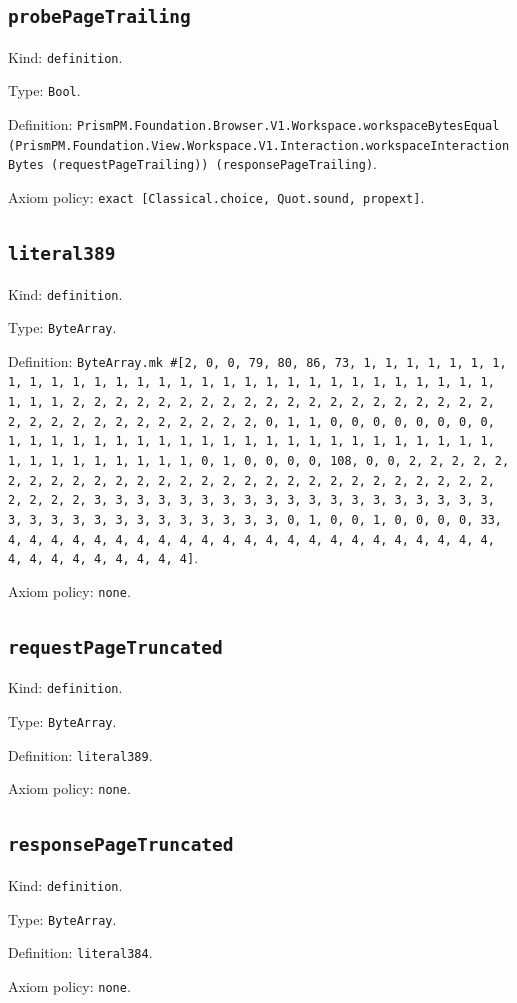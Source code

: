 \documentclass[11pt]{article}
\begin{document}
\subsection*{\texttt{probePageTrailing}}
\noindent Kind: \texttt{definition}.\par
\noindent Type: \texttt{Bool}.\par
\noindent Definition: \texttt{PrismPM.Foundation.Browser.V1.Workspace.workspaceBytesEqual (PrismPM.Foundation.View.Workspace.V1.Interaction.workspaceInteractionBytes (requestPageTrailing)) (responsePageTrailing)}.\par
\noindent Axiom policy: \texttt{exact [Classical.choice, Quot.sound, propext]}.\par
\subsection*{\texttt{literal389}}
\noindent Kind: \texttt{definition}.\par
\noindent Type: \texttt{ByteArray}.\par
\noindent Definition: \texttt{ByteArray.mk \#[2, 0, 0, 79, 80, 86, 73, 1, 1, 1, 1, 1, 1, 1, 1, 1, 1, 1, 1, 1, 1, 1, 1, 1, 1, 1, 1, 1, 1, 1, 1, 1, 1, 1, 1, 1, 1, 1, 1, 1, 2, 2, 2, 2, 2, 2, 2, 2, 2, 2, 2, 2, 2, 2, 2, 2, 2, 2, 2, 2, 2, 2, 2, 2, 2, 2, 2, 2, 2, 2, 2, 2, 0, 1, 1, 0, 0, 0, 0, 0, 0, 0, 0, 1, 1, 1, 1, 1, 1, 1, 1, 1, 1, 1, 1, 1, 1, 1, 1, 1, 1, 1, 1, 1, 1, 1, 1, 1, 1, 1, 1, 1, 1, 1, 1, 0, 1, 0, 0, 0, 0, 108, 0, 0, 2, 2, 2, 2, 2, 2, 2, 2, 2, 2, 2, 2, 2, 2, 2, 2, 2, 2, 2, 2, 2, 2, 2, 2, 2, 2, 2, 2, 2, 2, 2, 2, 3, 3, 3, 3, 3, 3, 3, 3, 3, 3, 3, 3, 3, 3, 3, 3, 3, 3, 3, 3, 3, 3, 3, 3, 3, 3, 3, 3, 3, 3, 3, 3, 0, 1, 0, 0, 1, 0, 0, 0, 0, 33, 4, 4, 4, 4, 4, 4, 4, 4, 4, 4, 4, 4, 4, 4, 4, 4, 4, 4, 4, 4, 4, 4, 4, 4, 4, 4, 4, 4, 4, 4, 4, 4]}.\par
\noindent Axiom policy: \texttt{none}.\par
\subsection*{\texttt{requestPageTruncated}}
\noindent Kind: \texttt{definition}.\par
\noindent Type: \texttt{ByteArray}.\par
\noindent Definition: \texttt{literal389}.\par
\noindent Axiom policy: \texttt{none}.\par
\subsection*{\texttt{responsePageTruncated}}
\noindent Kind: \texttt{definition}.\par
\noindent Type: \texttt{ByteArray}.\par
\noindent Definition: \texttt{literal384}.\par
\noindent Axiom policy: \texttt{none}.\par
\end{document}
